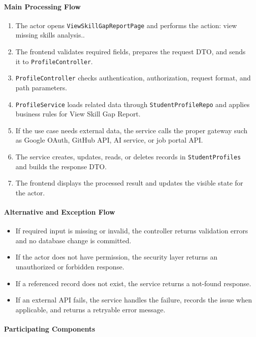 \paragraph{Main Processing Flow}

\begin{enumerate}
    \item The actor opens \texttt{ViewSkillGapReportPage} and performs the action: view missing skills analysis..
    \item The frontend validates required fields, prepares the request DTO, and sends it to \texttt{ProfileController}.
    \item \texttt{ProfileController} checks authentication, authorization, request format, and path parameters.
    \item \texttt{ProfileService} loads related data through \texttt{StudentProfileRepo} and applies business rules for View Skill Gap Report.
    \item If the use case needs external data, the service calls the proper gateway such as Google OAuth, GitHub API, AI service, or job portal API.
    \item The service creates, updates, reads, or deletes records in \texttt{StudentProfiles} and builds the response DTO.
    \item The frontend displays the processed result and updates the visible state for the actor.
\end{enumerate}

\paragraph{Alternative and Exception Flow}

\begin{itemize}
    \item If required input is missing or invalid, the controller returns validation errors and no database change is committed.
    \item If the actor does not have permission, the security layer returns an unauthorized or forbidden response.
    \item If a referenced record does not exist, the service returns a not-found response.
    \item If an external API fails, the service handles the failure, records the issue when applicable, and returns a retryable error message.
\end{itemize}

\paragraph{Participating Components}

